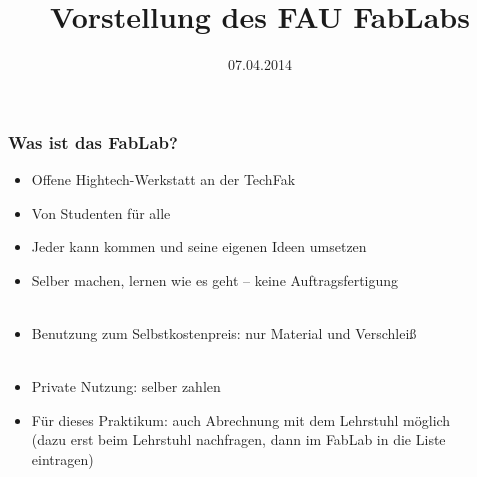 \documentclass[t]{beamer}
\begin{document}


\date{07.04.2014}
\title[Vorstellung]{Vorstellung des FAU FabLabs}
\author{} %
\frame[plain,c]{\titlepage} %




\begin{frame}
	\frametitle{Was ist das FabLab?}
	\begin{itemize}
		\item Offene Hightech-Werkstatt an der TechFak
		\item Von Studenten für alle
		\item Jeder kann kommen und seine eigenen Ideen umsetzen
		\item Selber machen, lernen wie es geht -- keine Auftragsfertigung\\~
		\item Benutzung zum Selbstkostenpreis: nur Material und Verschleiß\\~
		\item Private Nutzung: selber zahlen
		\item Für dieses Praktikum: auch Abrechnung mit dem Lehrstuhl möglich \\(dazu erst beim Lehrstuhl nachfragen, dann im FabLab in die Liste eintragen)
	\end{itemize}

\end{frame}

% 
% 
\end{document}
